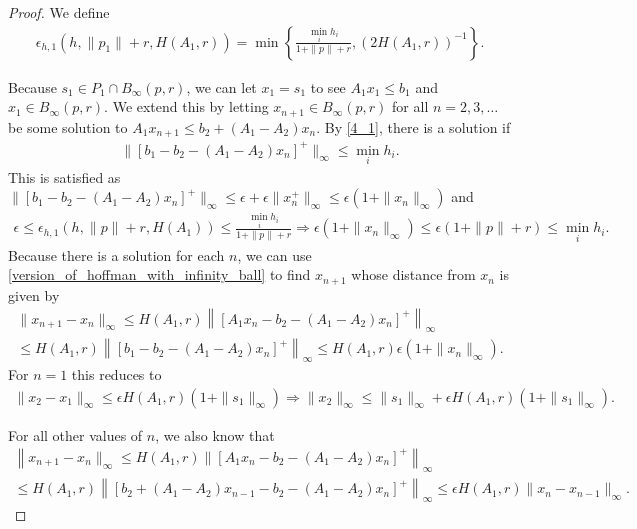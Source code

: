 \documentclass{article}
\theoremstyle{case}
\numberwithin{theorem}{subsection}
\newcommand{\bpr}{{B_{\infty}\left(p, r\right)}}
\begin{document}
\begin{proof}
We define
\begin{align*}
\epsilon_{h, 1}\left(h, \|p_1\| + r, H\left(A_1, r\right)\right)
= \min\left\{\frac{\min_i h_i}{1 + \|p\| + r},\left(2 H\left(A_1, r\right)\right)^{-1}\right\}.
\end{align*}

Because $s_1 \in P_1 \cap \bpr$, we can let $x_1 = s_1$ to see $A_1x_1 \le b_1$ and $x_1 \in \bpr$.
We extend this by letting $x_{n+1} \in \bpr$ for all $n = 2, 3, \ldots$ be some solution to
$A_1 x_{n+1} \le b_2 + (A_1 - A_2) x_n$.
By \cref{4_1}, there is a solution if
\begin{align*}
\|[b_1 - b_2 - (A_1 - A_2)x_n]^+\|_\infty \le \min_i h_i.
\end{align*}
This is satisfied as $\|[b_1 - b_2 - (A_1 - A_2)x_n]^+\|_{\infty} \le \epsilon + \epsilon\| x_n^+\|_{\infty} \le \epsilon(1 + \|x_n\|_\infty)$
and
\begin{align*}
\epsilon \le \epsilon_{h, 1}\left(h, \|p\| + r, H\left(A_1\right)\right) \le \frac{\min_i h_i}{1 + \|p\| + r} \Longrightarrow
\epsilon(1 + \|x_n\|_\infty) \le \epsilon(1 + \|p\| + r) \le \min_i h_i.
\end{align*}
Because there is a solution for each $n$, we can use \cref{version_of_hoffman_with_infinity_ball} 
to find $x_{n+1}$ whose distance from $x_n$ is given by
\begin{align*}
\|x_{n+1} - x_n\|_\infty \le  H\left(A_1, r\right) \left\|[A_1x_n - b_2 - (A_1 - A_2)x_n]^+\right\|_\infty \\
\le  H\left(A_1, r\right)\left\|[b_1 - b_2 - (A_1 - A_2)x_n]^+\right\|_\infty\le  H\left(A_1, r\right) \epsilon(1 + \|x_n\|_\infty).
\end{align*}
For $n=1$ this reduces to
\begin{align*}
\|x_2 - x_1\|_\infty \le \epsilon H\left(A_1, r\right) (1 + \|s_1\|_\infty)
\Longrightarrow \|x_2\|_\infty \le \|s_1\| _\infty+ \epsilon H\left(A_1, r\right)(1 + \|s_1\|_\infty).
\end{align*}

For all other values of $n$, we also know that
\begin{align*}
\left\|x_{n+1} - x_{n}\|_\infty \le  H\left(A_1, r\right)\|[A_1x_n - b_2 - (A_1 - A_2)x_n]^+\right\|_\infty \\
\le  H\left(A_1, r\right)\left\|[b_2 + (A_1 - A_2)x_{n-1} - b_2 - (A_1 - A_2)x_n]^+\right\|_\infty
\le \epsilon  H\left(A_1, r\right)  \|x_{n}-x_{n-1}\|_\infty.
\end{align*}


\end{proof}
\end{document}
